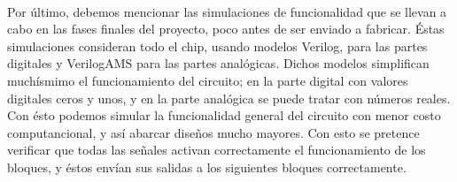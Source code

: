 \paragraph{}
Por último, debemos mencionar las simulaciones de funcionalidad que se llevan
a cabo en las fases finales del proyecto, poco antes de ser enviado a fabricar.
Éstas simulaciones consideran todo el chip, usando modelos Verilog, para las partes
digitales y VerilogAMS para las partes analógicas. Dichos modelos simplifican
muchísmimo el funcionamiento del circuito; en la parte digital con valores
digitales ceros y unos, y en la parte analógica se puede tratar con números reales.
Con ésto podemos simular la funcionalidad general del circuito con menor costo
computancional, y así abarcar diseños mucho mayores. Con esto se pretence verificar
que todas las señales activan correctamente el funcionamiento de los bloques, y éstos
envían sus salidas a los siguientes bloques correctamente.
